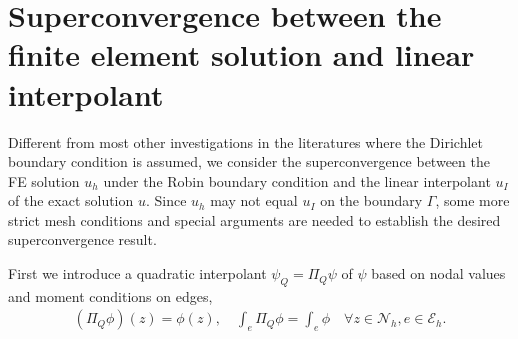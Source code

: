\documentclass[leqno,final]{siamltex}
\numberwithin{equation}{section}
\newcommand{\Ga}{\Gamma}
\newcommand{\N}{\mathcal{N}}
\newcommand{\E}{\mathcal{E}}
\newcommand{\eq}[1]{\begin{align}#1\end{align}}
\begin{document}
\section{ Superconvergence between the finite element solution and linear interpolant} \label{sup}
Different from most other investigations in the literatures where the Dirichlet boundary condition is assumed, we
consider the superconvergence between the FE solution $u_h$ under the Robin boundary condition
and the linear interpolant $u_I$ of the exact solution $u$.
Since $u_h$ may not equal $u_I$ on the boundary $\Ga$, some more strict mesh conditions and special arguments are needed to
establish the desired superconvergence result.

First we introduce a quadratic interpolant $\psi_Q=\Pi_Q\psi$ of $\psi$ based on nodal values and
moment conditions on edges,
\eq{ (\Pi_Q\phi)(z)=\phi(z),\quad \int_e\Pi_Q\phi=\int_e\phi\quad \forall z\in\N_h,e\in\E_h. }
\end{document}
